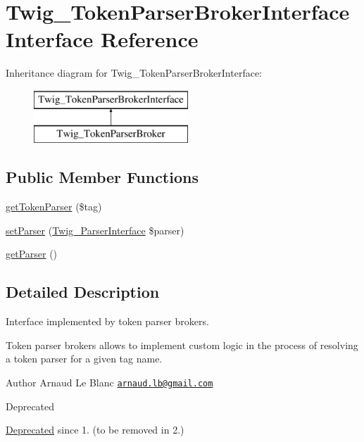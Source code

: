 \hypertarget{interface_twig___token_parser_broker_interface}{}\section{Twig\+\_\+\+Token\+Parser\+Broker\+Interface Interface Reference}
\label{interface_twig___token_parser_broker_interface}
Inheritance diagram for Twig\+\_\+\+Token\+Parser\+Broker\+Interface\+:\begin{figure}[H]
\begin{center}
\leavevmode
\includegraphics[height=2.000000cm]{interface_twig___token_parser_broker_interface}
\end{center}
\end{figure}
\subsection*{Public Member Functions}
\begin{DoxyCompactItemize}
\item 
\hyperlink{interface_twig___token_parser_broker_interface_adff2d8a3b28dce12e0bccd335af4012f}{get\+Token\+Parser} (\$tag)
\item 
\hyperlink{interface_twig___token_parser_broker_interface_ac16cd9a5f9db326226c01aa3ee943857}{set\+Parser} (\hyperlink{interface_twig___parser_interface}{Twig\+\_\+\+Parser\+Interface} \$parser)
\item 
\hyperlink{interface_twig___token_parser_broker_interface_a4b6907ea868dc9053e1f7d6260fa4b4f}{get\+Parser} ()
\end{DoxyCompactItemize}


\subsection{Detailed Description}
Interface implemented by token parser brokers.

Token parser brokers allows to implement custom logic in the process of resolving a token parser for a given tag name.

\begin{DoxyAuthor}{Author}
Arnaud Le Blanc \href{mailto:arnaud.lb@gmail.com}{\tt arnaud.\+lb@gmail.\+com} 
\end{DoxyAuthor}
\begin{DoxyRefDesc}{Deprecated}
\item[\hyperlink{deprecated__deprecated000028}{Deprecated}]since 1. (to be removed in 2.) \end{DoxyRefDesc}


